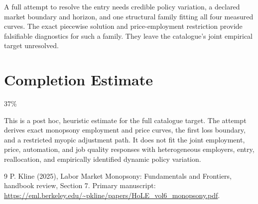 \documentclass[11pt]{article}
\begin{document}
A full attempt to resolve the entry needs credible policy variation, a declared market boundary and horizon, and one structural family fitting all four measured curves. The exact piecewise solution and price-employment restriction provide falsifiable diagnostics for such a family. They leave the catalogue's joint empirical target unresolved.

\section{Completion Estimate}
37\%

This is a post hoc, heuristic estimate for the full catalogue target.
The attempt derives exact monopsony employment and price curves, the first loss boundary, and a restricted myopic adjustment path. It does not fit the joint employment, price, automation, and job quality responses with heterogeneous employers, entry, reallocation, and empirically identified dynamic policy variation.

\begin{thebibliography}{9}
 P. Kline (2025), Labor Market Monopsony: Fundamentals and Frontiers, handbook review, Section 7. Primary manuscript:
\url{https://eml.berkeley.edu/~pkline/papers/HoLE_vol6_monopsony.pdf}.
\end{thebibliography}
\end{document}
